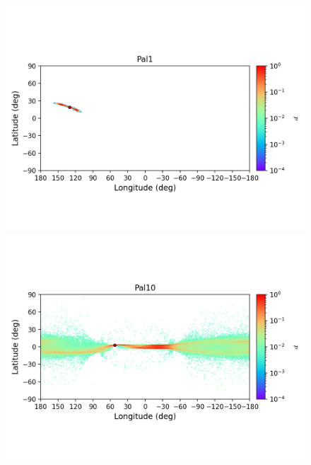         \begin{figure}
            \begin{center}
                \includegraphics[clip=true, trim = 0mm 20mm 0mm 10mm, width=1\columnwidth]{images/error_plots_Pal1.png}
                \includegraphics[clip=true, trim = 0mm 20mm 0mm 10mm, width=1\columnwidth]{images/error_plots_Pal10.png}
                

\end{center}
\end{figure}
